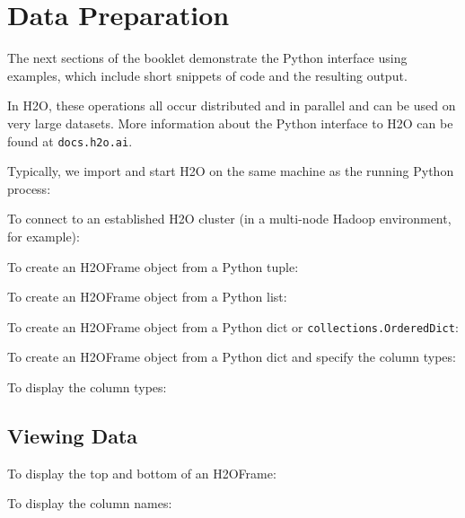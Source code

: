 {\section{Data Preparation}
The next sections of the booklet demonstrate the Python interface using examples, which include  short snippets of code and the
resulting output.  

In H2O, these operations all occur distributed and in
parallel and can be used on very large datasets.  More information about the
Python interface to H2O can be found at {\texttt{docs.h2o.ai}}.

Typically, we import and start H2O on the same machine as the running Python process:


To connect to an established H2O cluster (in a multi-node Hadoop environment, for example):


\newpage
To create an H2OFrame object from a Python tuple:


To create an H2OFrame object from a Python list:


To create an H2OFrame object from a Python dict or \texttt{collections.OrderedDict}:


To create an H2OFrame object from a Python dict and specify the column types:


To display the column types:


\subsection{Viewing Data}
To display the top and bottom of an H2OFrame:



To display the column names:


}
